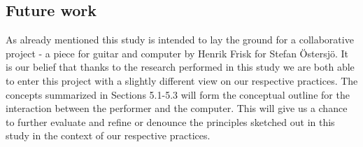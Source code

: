 \documentclass[10pt,letterpaper]{article}
\begin{document}
\subsection{Future work}
As already mentioned this study is intended to lay the ground for a
collaborative project - a piece for guitar and computer by Henrik Frisk
for Stefan {\"O}stersj{\"o}. It is our belief that thanks to the
research performed in this study we are both able to
enter this project with a slightly different view on our respective
practices. The concepts summarized in Sections 5.1-5.3 will form the
conceptual outline for the interaction between the performer and the
computer. This will give us a chance to further evaluate and refine or
denounce the principles sketched out in this study in the context of our
respective practices.



% 


\small{

}
\end{document}
